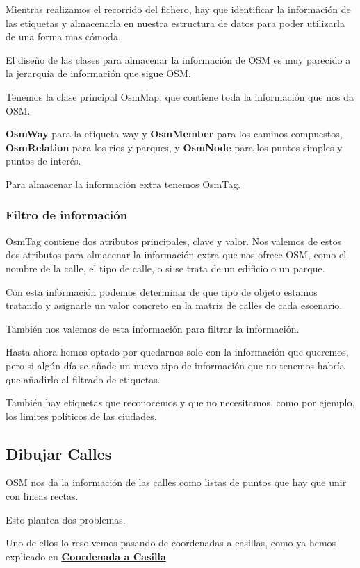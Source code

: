 Mientras realizamos el recorrido del fichero, hay que identificar la
información de las etiquetas y almacenarla en nuestra estructura de datos para
poder utilizarla de una forma mas cómoda.

El diseño de las clases para almacenar la información de OSM es muy parecido a
la jerarquía de información que sigue OSM.

Tenemos la clase principal OsmMap, que contiene toda la información que nos da
OSM.

{\bf OsmWay} para la etiqueta way y {\bf OsmMember} para los caminos
compuestos, {\bf OsmRelation} para los rios y parques, y {\bf OsmNode} para los
puntos simples y puntos de interés. 

Para almacenar la información extra tenemos OsmTag.
\subsubsection*{Filtro de información}
OsmTag contiene dos atributos principales, clave y valor. Nos valemos de estos
dos atributos para almacenar la información extra que nos ofrece OSM, como el
nombre de la calle, el tipo de calle, o si se trata de un edificio o un parque.

Con esta información podemos determinar de que tipo de objeto estamos tratando
y asignarle un valor concreto en la matriz de calles de cada escenario.

También nos valemos de esta información para filtrar la información.

Hasta ahora hemos optado por quedarnos solo con la información que queremos,
pero si algún día se añade un nuevo tipo de información que no tenemos habría
que añadirlo al filtrado de etiquetas.

También hay etiquetas que reconocemos y que no necesitamos, como por ejemplo,
los limites políticos de las ciudades.

\subsection*{Dibujar Calles}
OSM nos da la información de las calles como listas de puntos que hay que unir
con lineas rectas.

Esto plantea dos problemas.

Uno de ellos lo resolvemos pasando de coordenadas a casillas, como ya hemos
explicado en \hyperref[coordToCasilla]{\bf Coordenada a Casilla}

